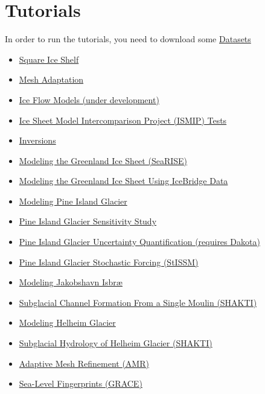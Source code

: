 
\section{Tutorials} \label{sec:using-issm-tutorials}
In order to run the tutorials, you need to download some 
\hyperref[sec:using-issm-tutorials-datasets]{Datasets}

\begin{itemize}
	\item \hyperref[sec:using-issm-tutorials-squareiceshelf]{Square Ice Shelf}
	\item \hyperref[sec:using-issm-tutorials-mesh]{Mesh Adaptation}
	\item \hyperref[sec:using-issm-tutorials-iceflowmodels]{Ice Flow Models (under development)}
	\item \hyperref[sec:using-issm-tutorials-ismip]{Ice Sheet Model Intercomparison Project (ISMIP) Tests}
	\item \hyperref[sec:using-issm-tutorials-inversions]{Inversions}
	\item \hyperref[sec:using-issm-tutorials-greenland]{Modeling the Greenland Ice Sheet (SeaRISE)}
	\item \hyperref[sec:using-issm-tutorials-icebridge]{Modeling the Greenland Ice Sheet Using IceBridge Data}
	\item \hyperref[sec:using-issm-tutorials-pig]{Modeling Pine Island Glacier}
	\item \hyperref[sec:using-issm-tutorials-pigsensitivity]{Pine Island Glacier Sensitivity Study}
	\item \hyperref[sec:using-issm-tutorials-uncertaintyquantification]{Pine Island Glacier Uncertainty Quantification (requires Dakota)}
	\item \hyperref[sec:using-issm-tutorials-pigstissm]{Pine Island Glacier Stochastic Forcing (StISSM)}
	\item \hyperref[sec:using-issm-tutorials-jks]{Modeling Jakobshavn Isbr\ae}
	\item \hyperref[sec:using-issm-tutorials-shakti]{Subglacial Channel Formation From a Single Moulin (SHAKTI)}
	\item \hyperref[sec:using-issm-tutorials-helheim]{Modeling Helheim Glacier}
	\item \hyperref[sec:using-issm-tutorials-helheimshakti]{Subglacial Hydrology of Helheim Glacier (SHAKTI)}
	\item \hyperref[sec:using-issm-tutorials-amr]{Adaptive Mesh Refinement (AMR)}
	\item \hyperref[sec:using-issm-tutorials-sealevelfingerprints]{Sea-Level Fingerprints (GRACE)}
\end{itemize}
